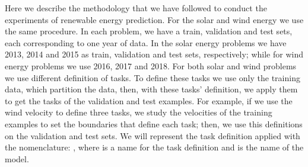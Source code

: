 Here we describe the methodology that we have followed to conduct the experiments of renewable energy prediction.
%
For the solar and wind energy we use the same procedure. In each problem, we have a train, validation and test sets, each corresponding to one year of data. In the solar energy problems we have 2013, 2014 and 2015 as train, validation and test sets, respectively; while for wind energy problems we use 2016, 2017 and 2018.
%
For both solar and wind problems we use different definition of tasks. To define these tasks we use only the training data, which partition the data, then, with these tasks' definition, we apply them to get the tasks of the validation and test examples.
%
For example, if we use the wind velocity to define three tasks, we study the velocities of the training examples to set the boundaries that define each task; then, we use this definitions on the validation and test sets.
%
We will represent the task definition applied with the nomenclature: , where  is a name for the task definition and  is the name of the model.

